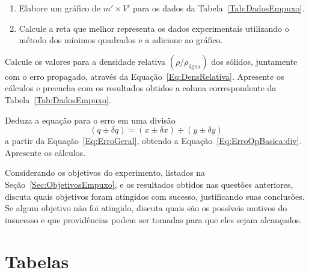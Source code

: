 \begin{question}[type={exam}]{2}
\begin{enumerate}[label=\roman*.]
    \item Elabore um gráfico de $m' \times V'$ para os dados da Tabela~\ref{Tab:DadosEmpuxo}.
    \item Calcule a reta que melhor representa os dados experimentais utilizando o método dos mínimos quadrados e a adicione ao gráfico.
\end{enumerate}
\end{question}

\begin{question}[type={exam}]{1.5}
Calcule os valores para a densidade relativa $(\rho/\rho_{\textrm{água}})$ dos sólidos, juntamente com o erro propagado, através da Equação~\ref{Eq:DensRelativa}. Apresente os cálculos e preencha com os resultados obtidos a coluna correspondente da Tabela~\ref{Tab:DadosEmpuxo}. 
\end{question}

\begin{question}[type={exam}]{1.5}
Deduza a equação para o erro em uma divisão
\begin{equation}
    (q \pm \delta q) = (x \pm \delta x) \div (y \pm \delta y)
\end{equation}
%
a partir da Equação~\eqref{Eq:ErroGeral}, obtendo a Equação~\eqref{Eq:ErroOpBasica:div}. Apresente os cálculos.
\end{question}

\begin{question}[type={exam}]{2}
Considerando os objetivos do experimento, listados na Seção~\ref{Sec:ObjetivosEmpuxo}, e os resultados obtidos nas questões anteriores, discuta quais objetivos foram atingidos com sucesso, justificando suas conclusões. Se algum objetivo não foi atingido, discuta quais são os possíveis motivos do insucesso e que providências podem ser tomadas para que eles sejam alcançados.
\end{question}

\vfill
\pagebreak
\section{Tabelas}

